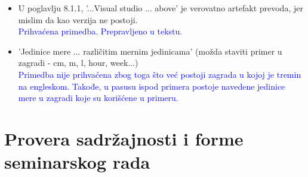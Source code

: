 \documentclass[a4paper]{report}
\newcommand{\odgovor}[1]{\textcolor{blue}{#1}}
\begin{document}
\begin{itemize}
\item U poglavlju 8.1.1, '...Visual studio ... above' je verovatno artefakt prevoda, jer mislim da kao verzija ne postoji.
\\ \odgovor{Prihvaćena primedba. Prepravljeno u tekstu.} 

\item 'Jedinice mere ... različitim mernim jedinicama' (možda staviti primer u zagradi - cm, m, l, hour, week...)
\\ \odgovor{Primedba nije prihvaćena zbog toga što već postoji zagrada u kojoj je tremin na engleskom. Takođe, u pasusu ispod primera postoje navedene jedinice mere u zagradi koje su korišćene u primeru.} 

\end{itemize}
\section{Provera sadržajnosti i forme seminarskog rada}
\end{document}
